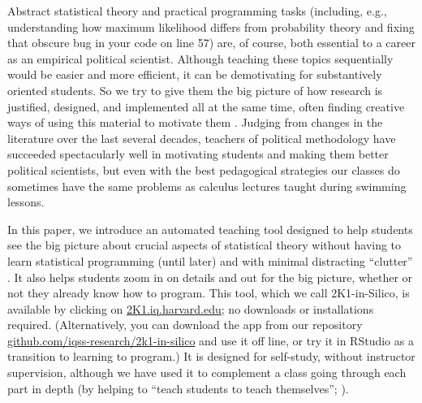 \documentclass[12pt]{article}
\theoremstyle{definition}
\begin{document}
Abstract statistical theory and practical programming tasks (including, e.g., understanding how maximum likelihood differs from probability theory and fixing that obscure bug in your code on line 57) are, of course, both essential to a career as an empirical political scientist. Although teaching these topics sequentially would be easier and more efficient, it can be demotivating for substantively oriented students. So we try to give them the big picture of how research is justified, designed, and implemented all at the same time, often finding creative ways of using this material to motivate them \citep{williams2022teaching}. Judging from changes in the literature over the last several decades, teachers of political methodology have succeeded spectacularly well in motivating students and making them better political scientists, but even with the best pedagogical strategies our classes do sometimes have the same problems as calculus lectures taught during swimming lessons.

In this paper, we introduce an automated teaching tool designed to help students see the big picture about crucial aspects of statistical theory without having to learn statistical programming (until later) and with minimal distracting ``clutter'' \citep{bailey2019teaching}. It also helps students zoom in on details and out for the big picture, whether or not they already know how to program. This tool, which we call 2K1-in-Silico, is available by clicking on \href{https://2k1.iq.harvard.edu}{2K1.iq.harvard.edu}; no downloads or installations required. (Alternatively, you can download the app from our repository \href{https://github.com/iqss-research/2k1-in-silico}{github.com/iqss-research/2k1-in-silico} and use it off line, or try it in RStudio as a transition to learning to program.) It is designed for self-study, without instructor supervision, although we have used it to complement a class going through each part in depth (by helping to ``teach students to teach themselves''; \citealt{Schleutker2022}).
\end{document}
